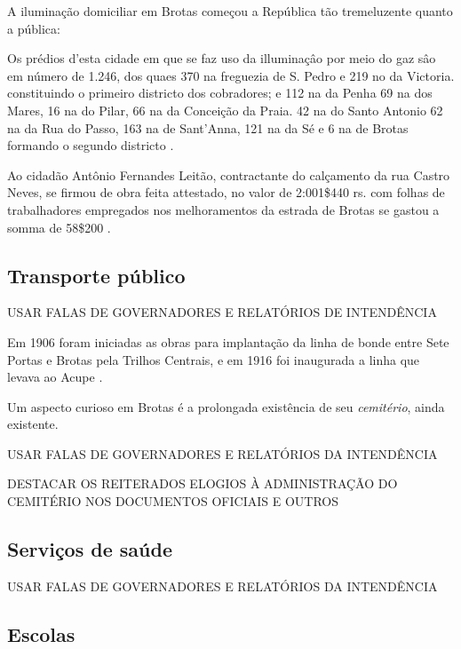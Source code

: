 A iluminação domiciliar em Brotas começou a República tão tremeluzente quanto a pública:

\begin{citacao}
Os prédios d'esta cidade em que se faz uso da illuminaçâo por meio do gaz sâo em número de 1.246, dos quaes 370 na freguezia de S. Pedro e 219 no da Victoria. constituindo o primeiro districto dos cobradores; e 112 na da Penha 69 na dos Mares, 16 na do Pilar, 66 na da Conceição da Praia. 42 na do Santo Antonio 62 na da Rua do Passo, 163 na de Sant'Anna, 121 na da Sé e 6 na de Brotas formando o segundo districto \cite[p.~151]{salvador_relatorio_1896}. 
\end{citacao}

\begin{citacao}
Ao cidadão Antônio Fernandes Leitão, contractante do calçamento da rua Castro Neves, se firmou de obra feita attestado, no valor de 2:001\$440 rs. com folhas de trabalhadores empregados nos melhoramentos da estrada de Brotas se gastou a somma de 58\$200 \cite[p.~]{salvador_relatorio_1896}.
\end{citacao}



\subsection{Transporte público}

USAR FALAS DE GOVERNADORES E RELATÓRIOS DE INTENDÊNCIA


Em 1906 foram iniciadas as obras para implantação da linha de bonde entre Sete Portas e Brotas pela Trilhos Centrais, e em 1916 foi inaugurada a linha que levava ao Acupe \cite[p.~299]{VASCONCELOS2002}.


Um aspecto curioso em Brotas é a prolongada existência de seu \textit{cemitério}, ainda existente.

USAR FALAS DE GOVERNADORES E RELATÓRIOS DA INTENDÊNCIA

DESTACAR OS REITERADOS ELOGIOS À ADMINISTRAÇÃO DO CEMITÉRIO NOS DOCUMENTOS OFICIAIS E OUTROS

\subsection{Serviços de saúde}

USAR FALAS DE GOVERNADORES E RELATÓRIOS DA INTENDÊNCIA

\subsection{Escolas} 

